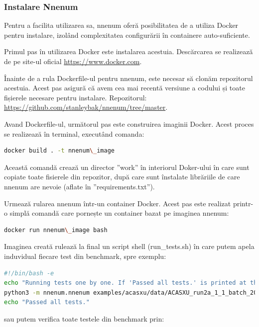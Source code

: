 \documentclass[12pt,a4paper]{article}
\begin{document}
\subsubsection{Instalare Nnenum}

Pentru a facilita utilizarea sa, nnenum oferă posibilitatea de a utiliza Docker pentru instalare, izolând complexitatea configurării în containere auto-suficiente.

Primul pas în utilizarea Docker este instalarea acestuia. Descărcarea se realizează de pe site-ul oficial \url{https://www.docker.com}.

Înainte de a rula Dockerfile-ul pentru nnenum, este necesar să clonăm repozitorul acestuia. Acest pas asigură că avem cea mai recentă versiune a codului și toate fișierele necesare pentru instalare. Repozitorul: \url{https://github.com/stanleybak/nnenum/tree/master}.

Avand Dockerfile-ul, următorul pas este construirea imaginii Docker. Acest proces se realizează în terminal, executând comanda:
\begin{lstlisting}[language=bash]
    docker build . -t nnenum\_image
\end{lstlisting}

Această comandă crează un director ”work” în interiorul Doker-ului în care sunt copiate toate fisierele din repozitor, după care sunt înstalate librăriile de care nnenum are nevoie (aflate în ”requirements.txt”).

Urmează rularea nnenum într-un container Docker. Acest pas este realizat printr-o simplă comandă care pornește un container bazat pe imaginea nnenum:
\begin{lstlisting}[language=bash]
    docker run nnenum\_image bash
\end{lstlisting}

Imaginea creată rulează la final un script shell (run\_tests.sh) în care putem apela induvidual fiecare test din benchmark, spre exemplu:

\vspace{2mm}

\begin{lstlisting}[language=bash]
#!/bin/bash -e
echo "Running tests one by one. If 'Passed all tests.' is printed at then end, then we were successful."
python3 -m nnenum.nnenum examples/acasxu/data/ACASXU_run2a_1_1_batch_2000.onnx examples/acasxu/data/prop_1.vnnlib
echo "Passed all tests."
\end{lstlisting}
sau putem verifica toate testele din benchmark prin:
\end{document}
